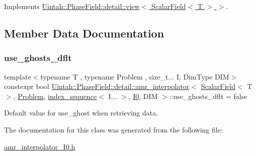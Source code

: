 Implements \hyperlink{classUintah_1_1PhaseField_1_1detail_1_1view_3_01ScalarField_3_01T_01_4_01_4_a5fc830b30b120922cfe8a2c008d96109}{Uintah\+::\+Phase\+Field\+::detail\+::view$<$ Scalar\+Field$<$ T $>$ $>$}.



\subsection{Member Data Documentation}
\mbox{\label{classUintah_1_1PhaseField_1_1detail_1_1amr__interpolator_3_01ScalarField_3_01T_01_4_00_01Problem64f2458f98b03e27672a091eecc4b696_a659b258bc11df07830b73859f57dee78}} 
\subsubsection{\texorpdfstring{use\+\_\+ghosts\+\_\+dflt}{use\_ghosts\_dflt}}
{\footnotesize\ttfamily template$<$typename T , typename Problem , size\+\_\+t... I, Dim\+Type D\+IM$>$ \\
constexpr bool \hyperlink{classUintah_1_1PhaseField_1_1detail_1_1amr__interpolator}{Uintah\+::\+Phase\+Field\+::detail\+::amr\+\_\+interpolator}$<$ \hyperlink{structUintah_1_1PhaseField_1_1ScalarField}{Scalar\+Field}$<$ T $>$, \hyperlink{classUintah_1_1PhaseField_1_1Problem}{Problem}, \hyperlink{namespaceUintah_1_1PhaseField_a237de804d99512e50613aff7c94a9461}{index\+\_\+sequence}$<$ I... $>$, \hyperlink{namespaceUintah_1_1PhaseField_a547ce3002aa97fbd3ef3192a6eec8406abdd8ebcbdfd71d1125937e3012dc45fb}{I0}, D\+IM $>$\+::use\+\_\+ghosts\+\_\+dflt = false\hspace{0.3cm}{\ttfamily [static]}}



Default value for use\+\_\+ghost when retrieving data. 



The documentation for this class was generated from the following file\+:\begin{DoxyCompactItemize}
\item 
\hyperlink{amr__interpolator__I0_8h}{amr\+\_\+interpolator\+\_\+\+I0.\+h}\end{DoxyCompactItemize}
